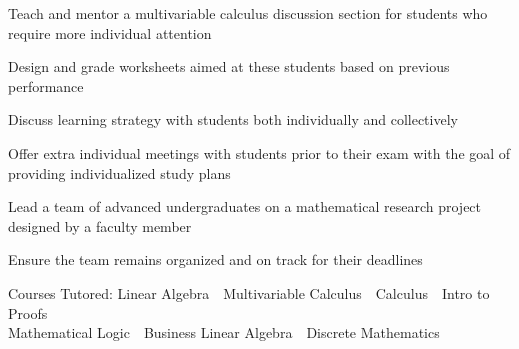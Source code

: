 \documentclass[letterpaper]{rennie-resume} %
\begin{document}
\sectionspace 
{}
\begin{tightitemize}
\item Teach and mentor a multivariable calculus discussion section for students who require more individual attention
\item Design and grade worksheets aimed at these students based on previous performance
\item Discuss learning strategy with students both individually and collectively 
\item Offer extra individual meetings with students prior to their exam with the goal of providing individualized study plans
\end{tightitemize}

\sectionspace 
{}
\begin{tightitemize}
\item Lead a team of advanced undergraduates on a mathematical research project designed by a faculty member
\item Ensure the team remains organized and on track for their deadlines
\end{tightitemize}

\sectionspace 
{}
\begin{tightitemize}
\item Courses Tutored: Linear Algebra\ \textbullet\  Multivariable Calculus\ \textbullet\  Calculus\ \textbullet\  Intro to Proofs \\ Mathematical Logic\  \textbullet\  Business Linear Algebra\ \textbullet\  Discrete Mathematics
\end{tightitemize}

\sectionspace 

\end{document}
